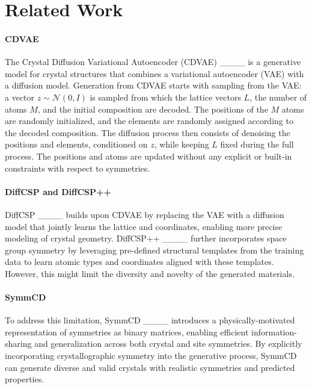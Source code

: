 \section{Related Work}
\paragraph{CDVAE}
The Crystal Diffusion Variational Autoencoder (CDVAE) ____ is a generative model for crystal structures that combines a variational autoencoder (VAE) with a diffusion model. Generation from CDVAE starts with sampling from the VAE: a vector $z\sim\mathcal{N}(0, I)$ is sampled from which the lattice vectors $L$, the number of atoms $M$, and the initial composition are decoded. The positions of the $M$ atoms are randomly initialized, and the elements are randomly assigned according to the decoded composition. The diffusion process then consists of denoising the positions and elements, conditioned on $z$, while keeping $L$ fixed during the full process. The positions and atoms are updated without any explicit or built-in constraints with respect to symmetries. 


\paragraph{DiffCSP and DiffCSP++}
DiffCSP ____ builds upon CDVAE by replacing the VAE with a diffusion model that jointly learns the lattice and coordinates, enabling more precise modeling of crystal geometry. \mbox{DiffCSP++} ____ further incorporates space group symmetry by leveraging pre-defined structural templates from the training data to learn atomic types and coordinates aligned with these templates. However, this might limit the diversity and novelty of the generated materials.

\paragraph{SymmCD}
To address this limitation, SymmCD ____ introduces a physically-motivated representation of symmetries as binary matrices, enabling efficient information-sharing and generalization across both crystal and site symmetries. By explicitly incorporating crystallographic symmetry into the generative process, SymmCD can generate diverse and valid crystals with realistic symmetries and predicted properties.